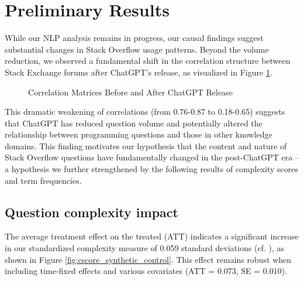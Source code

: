 \section{Preliminary Results}
While our NLP analysis remains in progress, our causal findings suggest substantial changes in Stack Overflow usage patterns. Beyond the volume reduction, we observed a fundamental shift in the correlation structure between Stack Exchange forums after ChatGPT's release, as visualized in Figure \ref{fig:correlation_matrix}.

\begin{figure}[htpb!]
    \centering
    
    \caption{Correlation Matrices Before and After ChatGPT Release}
    \label{fig:correlation_matrix}
\end{figure}

This dramatic weakening of correlations (from 0.76-0.87 to 0.18-0.65) suggests that ChatGPT has reduced question volume and potentially altered the relationship between programming questions and those in other knowledge domains. This finding motivates our hypothesis that the content and nature of Stack Overflow questions have fundamentally changed in the post-ChatGPT era -- a hypothesis we further strengthened by the following results of complexity scores and term frequencies.


\subsection{Question complexity impact}

The average treatment effect on the treated (ATT) indicates a significant increase in our standardized complexity measure of 0.059 standard deviations (cf. ), as shown in Figure \ref{fig:cscore_synthetic_control}. This effect remains robust when including time-fixed effects and various covariates (ATT = 0.073, SE = 0.010).  

